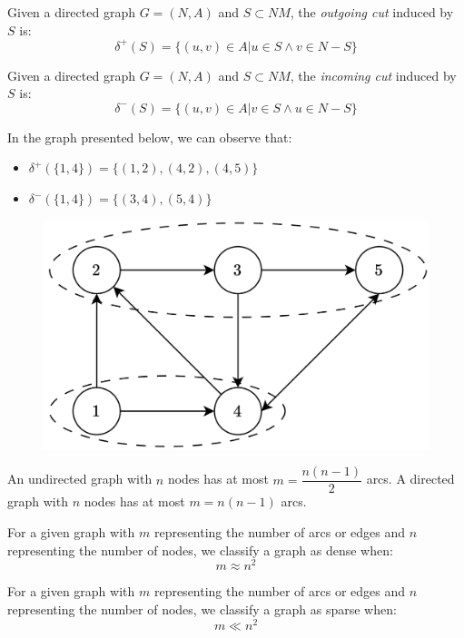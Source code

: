 \begin{definition}
    Given a directed graph $G=(N,A)$ and $S \subset NM$, the \emph{outgoing cut} induced by $S$ is:
    \[ \delta^{+}(S)=\{(u,v) \in A | u \in S \land v \in N-S \} \]
\end{definition}
\begin{definition}
    Given a directed graph $G=(N,A)$ and $S \subset NM$, the \emph{incoming cut} induced by $S$ is:
    \[ \delta^{-}(S)=\{(u,v) \in A | v \in S \land u \in N-S \} \]
\end{definition}
\begin{example}
    In the graph presented below, we can observe that:
    \begin{itemize}
        \item $\delta^{+}(\{1,4\})=\{(1,2),(4,2),(4,5)\}$
        \item $\delta^{-}(\{1,4\})=\{(3,4),(5,4)\}$
    \end{itemize}
    \begin{figure}[H]
        \centering
        \includegraphics[width=0.4\linewidth]{images/cuts.png}
    \end{figure}
\end{example}
An undirected graph with $n$ nodes has at most $m=\dfrac{n(n-1)}{2}$ arcs. 
A directed graph with $n$ nodes has at most $m=n(n-1)$ arcs.
\begin{definition}
    For a given graph with $m$ representing the number of arcs or edges and $n$ representing the number of nodes, we classify a graph as dense when:
    \[m \approx n^2\]
\end{definition}
\begin{definition}
    For a given graph with $m$ representing the number of arcs or edges and $n$ representing the number of nodes, we classify a graph as sparse when:
    \[m \ll n^2\]
\end{definition}

